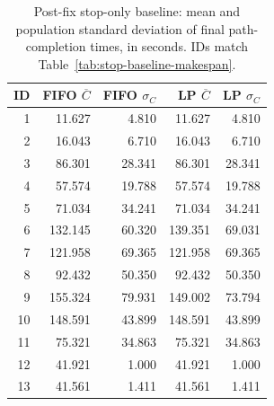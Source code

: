 \begin{table}[htbp]
\centering\small
\setlength{\tabcolsep}{4pt}
\caption{Post-fix stop-only baseline: mean and population standard deviation of final path-completion times, in seconds. IDs match Table~\ref{tab:stop-baseline-makespan}.}
\label{tab:stop-baseline-mean}
\begin{tabular}{rrrrr}
\toprule
ID & FIFO $\overline C$ & FIFO $\sigma_C$ & LP $\overline C$ & LP $\sigma_C$\\
\midrule
1 & 11.627 & 4.810 & 11.627 & 4.810\\
2 & 16.043 & 6.710 & 16.043 & 6.710\\
3 & 86.301 & 28.341 & 86.301 & 28.341\\
4 & 57.574 & 19.788 & 57.574 & 19.788\\
5 & 71.034 & 34.241 & 71.034 & 34.241\\
6 & 132.145 & 60.320 & 139.351 & 69.031\\
7 & 121.958 & 69.365 & 121.958 & 69.365\\
8 & 92.432 & 50.350 & 92.432 & 50.350\\
9 & 155.324 & 79.931 & 149.002 & 73.794\\
10 & 148.591 & 43.899 & 148.591 & 43.899\\
11 & 75.321 & 34.863 & 75.321 & 34.863\\
12 & 41.921 & 1.000 & 41.921 & 1.000\\
13 & 41.561 & 1.411 & 41.561 & 1.411\\
\bottomrule
\end{tabular}
\end{table}

